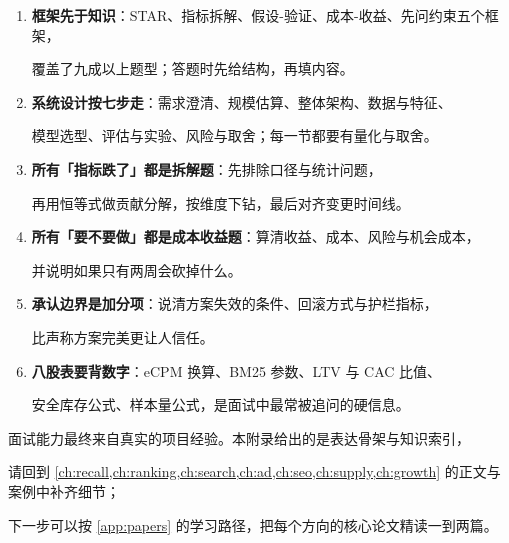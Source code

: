 \begin{keypoint}[本章要点回顾]

\begin{enumerate}

  \item \textbf{框架先于知识}：STAR、指标拆解、假设-验证、成本-收益、先问约束五个框架，

        覆盖了九成以上题型；答题时先给结构，再填内容。

  \item \textbf{系统设计按七步走}：需求澄清、规模估算、整体架构、数据与特征、

        模型选型、评估与实验、风险与取舍；每一节都要有量化与取舍。

  \item \textbf{所有「指标跌了」都是拆解题}：先排除口径与统计问题，

        再用恒等式做贡献分解，按维度下钻，最后对齐变更时间线。

  \item \textbf{所有「要不要做」都是成本收益题}：算清收益、成本、风险与机会成本，

        并说明如果只有两周会砍掉什么。

  \item \textbf{承认边界是加分项}：说清方案失效的条件、回滚方式与护栏指标，

        比声称方案完美更让人信任。

  \item \textbf{八股表要背数字}：eCPM 换算、BM25 参数、LTV 与 CAC 比值、

        安全库存公式、样本量公式，是面试中最常被追问的硬信息。

\end{enumerate}

\end{keypoint}

面试能力最终来自真实的项目经验。本附录给出的是表达骨架与知识索引，

请回到 \cref{ch:recall,ch:ranking,ch:search,ch:ad,ch:seo,ch:supply,ch:growth} 的正文与案例中补齐细节；

下一步可以按 \cref{app:papers} 的学习路径，把每个方向的核心论文精读一到两篇。

\begin{interview}[题库与答题要点]

\end{interview}
